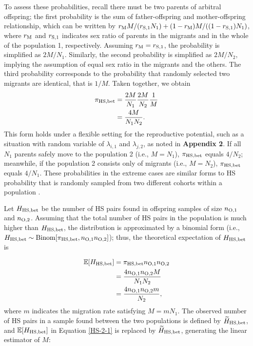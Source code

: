 \documentclass[12pt, English]{article}
\begin{document}
\begin{spacing}{1.9}
To assess these probabilities, recall there must be two parents of arbitral offspring; the first probability is the sum of father-offspring and mother-offspring relationship, which can be written by $r_{\rm M}M/(r_{\rm S,1}N_{1}) + (1 - r_{\rm M})M/((1-r_{\rm S,1})N_{1})$, where $r_{\rm M}$ and $r_{\rm S,1}$ indicates sex ratio of parents in the migrants and in the whole of the population 1, respectively. Assuming $r_{\rm M} = r_{\rm S,1}$, the probability is simplified as $2M/N_{1}$. Similarly, the second probability is simplified as $2M/N_{2}$, implying the assumption of equal sex ratio in the migrants and the others. The third probability corresponds to the probability that randomly selected two migrants are identical, that is $1/M$. Taken together, we obtain
\begin{align}
\pi_{\rm HS,bet} &= \frac{2M}{N_{1}} \frac{2M}{N_{2}} \frac{1}{M} \nonumber\\
&= \frac{4M}{N_{1}N_{2}}.
\label{HS-1}
\end{align}
This form holds under a flexible setting for the reproductive potential, such as a situation with random variable of $\lambda_{i,1}$ and $\lambda_{j,2}$, as noted in {\bf Appendix 2}. If all $N_1$ parents safely move to the population 2 (i.e., $M = N_1$), $\pi_{\rm HS,bet}$ equals $4/N_2$; meanwhile, if the population 2 consists only of migrants (i.e., $M = N_2$), $\pi_{\rm HS,bet}$ equals $4/N_1$. These probabilities in the extreme cases are similar forms to HS probability that is randomly sampled from two different cohorts within a population \cite[]{bravington2016close}. 

Let $H_{\rm HS,bet}$ be the number of HS pairs found in offspring samples of size $n_{\rm O, 1}$ and $n_{\rm O, 2}$. Assuming that the total number of HS pairs in the population is much higher than $H_{\rm HS,bet}$, the distribution is approximated by a binomial form (i.e., $H_{\rm HS,bet} \sim {\rm Binom}[\pi_{\rm HS,bet}, n_{\rm O, 1} n_{\rm O, 2}]$); thus, the theoretical expectation of $H_{\rm HS,bet}$ is

\begin{align}
\mathbb{E}[H_{\rm HS, bet}] &= \pi_{\rm HS,bet} n_{\rm O, 1} n_{\rm O, 2} \nonumber\\
&= \frac{ 4 n_{\rm O, 1} n_{\rm O, 2} M } { N_{1} N_{2} } \label{HS-2-1}\\
&= \frac{ 4 n_{\rm O, 1} n_{\rm O, 2} m } { N_{2} },
\label{HS-2-2}
\end{align}
where $m$ indicates the migration rate satisfying $M = mN_{1}$. The observed number of HS pairs in a sample found between the two populations is defined by $\widetilde{H}_{\rm HS, bet}$, and $\mathbb{E}[H_{\rm HS, bet}]$ in Equation \ref{HS-2-1} is replaced by $\widetilde{H}_{\rm HS, bet}$, generating the linear estimator of $M$:


\end{spacing}
\end{document}
